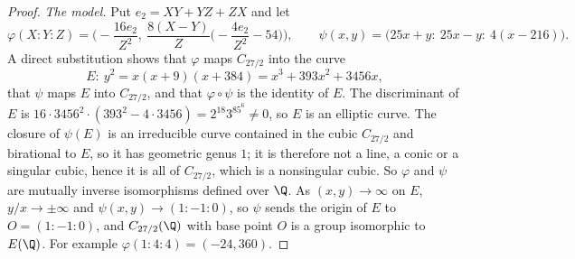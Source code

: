 \begin{proof}
\emph{The model.} Put $e_2=XY+YZ+ZX$ and let
\[
  \varphi(X:Y:Z)=\Big(-\frac{16e_2}{Z^2},\ \frac{8(X-Y)}Z\Big(-\frac{4e_2}{Z^2}-54\Big)\Big),\qquad
  \psi(x,y)=\big(25x+y:\ 25x-y:\ 4(x-216)\big).
\]
A direct substitution shows that $\varphi$ maps $C_{27/2}$ into the curve
\[
  E:\ y^2=x(x+9)(x+384)=x^3+393x^2+3456x,
\]
that $\psi$ maps $E$ into $C_{27/2}$, and that $\varphi\circ\psi$ is the identity of $E$. The
discriminant of $E$ is $16\cdot3456^2\cdot(393^2-4\cdot3456)=2^{18}3^85^6\ne0$, so $E$ is an elliptic
curve. The closure of $\psi(E)$ is an irreducible curve contained in the cubic $C_{27/2}$ and
birational to $E$, so it has geometric genus $1$; it is therefore not a line, a conic or a singular
cubic, hence it is all of $C_{27/2}$, which is a nonsingular cubic. So $\varphi$ and $\psi$ are mutually
inverse isomorphisms defined over $\Q$. As $(x,y)\to\infty$ on $E$, $y/x\to\pm\infty$ and $\psi(x,y)\to(1:-1:0)$, so
$\psi$ sends the origin of $E$ to $O=(1:-1:0)$, and $C_{27/2}(\Q)$ with base point $O$ is a group isomorphic to
$E(\Q)$. For example $\varphi(1:4:4)=(-24,360)$.


\end{proof}

